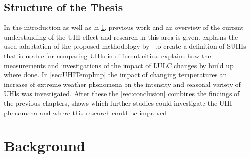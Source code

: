 \documentclass[12pt,a4paper, english,twoside]{scrartcl}
\begin{document}
  \subsection{Structure of the Thesis}\label{ssec:structure} 
    In the introduction as well as in \cref{sec:background}, previous work and an overview of the current understanding of the \gls{UHI} effect and research in this area is given. 
     explains the used adaptation of the proposed methodology by~\cite{Sobrino2020} to create a definition of \glspl{SUHI} that is usable for comparing \glspl{UHI} in different cities.  
     explains how the measurements  and investigations of the impact of \gls{LULC} changes by build up where done.
    In \cref{sec:UHITempImp} the impact of changing temperatures an increase of extreme weather phenomena on the intensity and seasonal variety of \glspl{UHI} was investigated. 
    After these the \cref{sec:conclusion} combines the findings of the previous chapters, shows which further studies could investigate the \gls{UHI} phenomena and where this research could be improved. 
%
\newpage
\section{Background}\label{sec:background}
\end{document}
